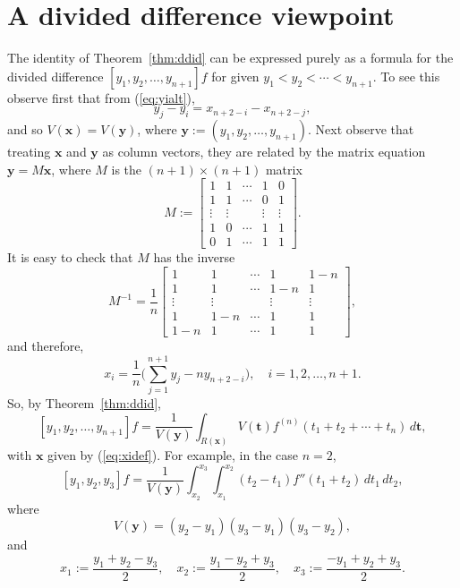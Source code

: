 \documentclass[12pt]{article}
\def\bft{\mathbf{t}}
\def\bfx{\mathbf{x}}
\def\bfy{\mathbf{y}}
\begin{document}
\section{A divided difference viewpoint}
The identity of Theorem~\ref{thm:ddid} can be
expressed purely as a formula for the divided difference
$[y_1,y_2,\ldots,y_{n+1}]f$ for given
$y_1 < y_2 < \cdots < y_{n+1}$.
To see this observe first that from (\ref{eq:yialt}), 
$$ y_j - y_i = x_{n+2-i} - x_{n+2-j}, $$
and so $V(\bfx) = V(\bfy)$, where $\bfy := (y_1,y_2,\ldots,y_{n+1})$.
Next observe that treating $\bfx$ and $\bfy$ as column vectors,
they are related by the matrix equation $\bfy = M \bfx$, where
$M$ is the $(n+1) \times (n+1)$ matrix
$$
M :=
\left[
\begin{matrix}
1 & 1 & \cdots & 1 & 0 \\
1 & 1 & \cdots & 0 & 1 \\
\vdots & \vdots & & \vdots & \vdots \\
1 & 0 & \cdots & 1 & 1 \\
0 & 1 & \cdots & 1 & 1
  \end{matrix}
  \right].
  $$
It is easy to check that $M$ has the inverse
$$
M^{-1} = \frac{1}{n}
\left[
\begin{matrix}
1 & 1 & \cdots & 1 & 1-n \\
1 & 1 & \cdots & 1-n & 1 \\
\vdots & \vdots & & \vdots & \vdots \\
1 & 1-n & \cdots & 1 & 1 \\
1-n & 1 & \cdots & 1 & 1
\end{matrix}
\right],
$$
and therefore,
\begin{equation}\label{eq:xidef}
x_i = \frac{1}{n} 
\Big(\sum_{j=1}^{n+1} y_j - n y_{n+2-i} \Big),
\quad i=1,2,\ldots,n+1.
\end{equation}
So, by Theorem~\ref{thm:ddid},
$$ [y_1,y_2,\ldots,y_{n+1}]f = \frac{1}{V(\bfy)}
\int_{R(\bfx)} V(\bft) f^{(n)}(t_1 + t_2 + \cdots + t_n) \, d\bft, $$
with $\bfx$ given by (\ref{eq:xidef}).
For example, in the case $n=2$,
$$ [y_1,y_2,y_3]f = \frac{1}{V(\bfy)}
\int_{x_2}^{x_3} \int_{x_1}^{x_2}
(t_2-t_1) f''(t_1+t_2) \, dt_1 \, dt_2, $$
where
$$ V(\bfy) = (y_2-y_1)(y_3-y_1)(y_3-y_2), $$
and
$$ x_1 := \frac{y_1 + y_2 - y_3}{2}, \quad
   x_2 := \frac{y_1 - y_2 + y_3}{2}, \quad
   x_3 := \frac{-y_1 + y_2 + y_3}{2}.
$$

\end{document}
